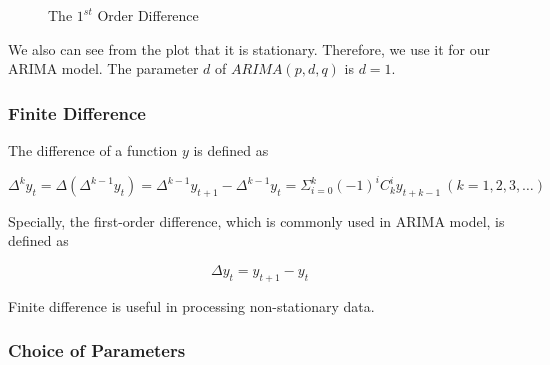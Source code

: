 \documentclass[12pt,a4paper]{article}
\newcommand{\Predictor}{ARIMA }
\begin{document}
\begin{spacing}{1.2}
\begin{figure}
	\begin{center}
		\caption{The $1^{st}$ Order Difference}
		\label{fig:diff}
	\end{center}
\end{figure}

We also can see from the plot that it is stationary. Therefore, we use it for our ARIMA model. The parameter $d$ of $ARIMA(p,d,q)$ is $d=1$.

\subsubsection{Finite Difference}

The difference of a function $y$ is defined as

$$
\Delta^k y_t = \Delta(\Delta^{k-1}y_t)=\Delta^{k-1}y_{t+1}-\Delta^{k-1}y_t=\Sigma_{i=0}^k(-1)^i C_k^iy_{t+k-1} \ (k=1,2,3,\dots)
$$

Specially, the first-order difference, which is commonly used in \Predictor model, is defined as

$$
\Delta y_t = y_{t+1} - y_{t}
$$

Finite difference is useful in processing non-stationary data.

\subsubsection{Choice of Parameters}


\end{spacing}
\end{document}
